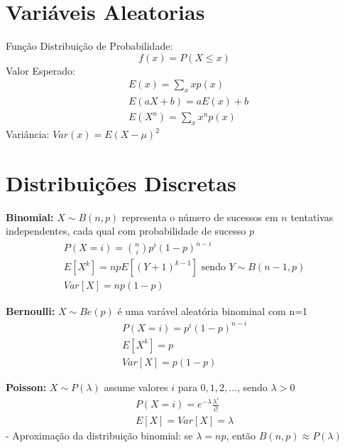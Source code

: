 \documentclass[10pt]{article}
\begin{document}

\pagebreak

\begin{multicols*}{2}

\section{Variáveis Aleatorias}

Função Distribuição de Probabilidade: 
\[ 
    f(x) = P(X \leq x)  
\]
Valor Esperado:
\begin{align*}
    & E(x) = \sum_x xp(x) 
    \\
    & E(aX + b) = aE(x) + b 
    \\
    & E(X^n) = \sum_x x^n p(x)
\end{align*}
Variância:
    $Var(x)=E(X-\mu )^2$

\section{Distribuições Discretas}

\textbf{Binomial:} $ X \sim B(n,p) $ representa o número de sucessos em $ n $ tentativas independentes,
cada qual com probabilidade de sucesso $ p $
\begin{gather*}
    P(X = i) = \binom{n}{i} p^i (1-p)^{n-i}
    \\
    E[X^k] = npE[(Y+1)^{k-1}] \text{ sendo } Y \sim B(n-1,p)
    \\
    Var[X] = np(1-p)
\end{gather*}

\textbf{Bernoulli:} $ X \sim Be(p) $ é uma varável aleatória binominal com n=1
\begin{gather*}
    P(X = i) = p^i (1-p)^{n-i}
    \\
    E[X^k] = p
    \\
    Var[X] = p(1-p)
\end{gather*}

\textbf{Poisson:} $ X \sim P(\lambda) $ assume valores $ i $ para $ 0,1,2,... $, sendo 
$ \lambda > 0 $
\begin{gather*}
    P(X = i) = e^{-\lambda} \frac{\lambda^i}{i!}
    \\
    E[X] = Var[X] = \lambda
\end{gather*}
    - Aproximação da distribuição binomial: se $ \lambda = np $, então 
    $ B(n,p) \approx P(\lambda) $
\\


\end{multicols*}
\end{document}
